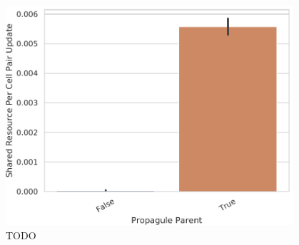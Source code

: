 \begin{figure}
\begin{columns}
\begin{column}{0.7\textwidth}
  \includegraphics[width=\textwidth]{img/treat=resource-wave__channelsense-yes__nlev-two+seed=1018+title=propagule_parent_resource_contributed+ext=}
\end{column}
\begin{column}{0.3\textwidth}
  \caption{
  TODO
  }
  \label{fig:endowment}
\end{column}
\end{columns}
\end{figure}
